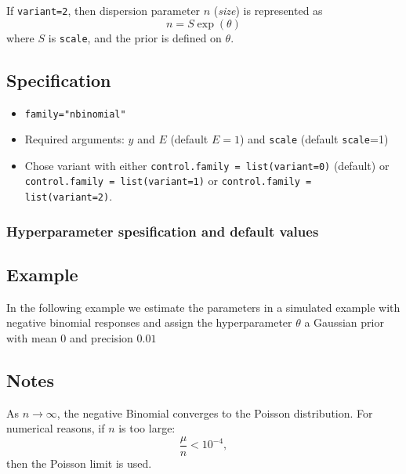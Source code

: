 \documentclass[a4paper,11pt]{article}
\begin{document}
If \verb|variant=2|, then dispersion parameter $n$ (\emph{size}) is
represented as
\begin{displaymath}
    n = S\exp(\theta)
\end{displaymath}
where $S$ is \texttt{scale}, and the prior is defined on $\theta$.

\subsection*{Specification}

\begin{itemize}
\item \texttt{family="nbinomial"}
\item Required arguments: $y$ and $E$ (default $E=1$) and
    \texttt{scale} (default \texttt{scale}=1)
\item Chose variant with either
    \verb|control.family = list(variant=0)| (default) or\\
    \verb|control.family = list(variant=1)| or \verb|control.family = list(variant=2)|.
    
\end{itemize}

\subsubsection*{Hyperparameter spesification and default values}



\subsection*{Example}

In the following example we estimate the parameters in a simulated
example with negative binomial responses and assign the hyperparameter
$\theta$ a Gaussian prior with mean $0$ and precision $0.01$


\subsection*{Notes}

As $n\rightarrow\infty$, the negative Binomial converges to the
Poisson distribution. For numerical reasons, if $n$ is too large:
\begin{displaymath}
    \frac{\mu}{n} < 10^{-4},
\end{displaymath}
then the Poisson limit is used.
\end{document}
